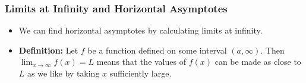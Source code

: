 \documentclass[serif,ignorenonframetext]{beamer}
\newcommand{\ds}{\displaystyle}
\begin{document}
\begin{frame}
  \frametitle{Limits at Infinity and Horizontal Asymptotes}
  \begin{itemize}[<+->]
  \item We can find horizontal asymptotes by calculating
    limits at infinity.
  \item \textbf{Definition:} Let $f$ be a function defined on 
    some interval $(a,\infty)$.  Then $\ds \lim_{x\to\infty} f(x)=L$
    means that the values of $f(x)$ can be made as close to $L$ as
    we like by taking $x$ sufficiently large.
  \end{itemize}
  \quad
  \quad
\end{frame}
\end{document}
